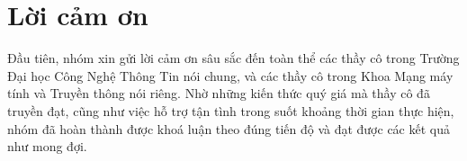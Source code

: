 \chapter*{\centering Lời cảm ơn}
Đầu tiên, nhóm xin gửi lời cảm ơn sâu sắc đến toàn thể các thầy cô trong Trường Đại học Công Nghệ Thông Tin nói chung, và các thầy cô trong Khoa Mạng máy tính và Truyền thông nói riêng. Nhờ những kiến thức quý giá mà thầy cô đã truyền đạt, cũng như việc hỗ trợ tận tình trong suốt khoảng thời gian thực hiện, nhóm đã hoàn thành được khoá luận theo đúng tiến độ và đạt được các kết quả như mong đợi.